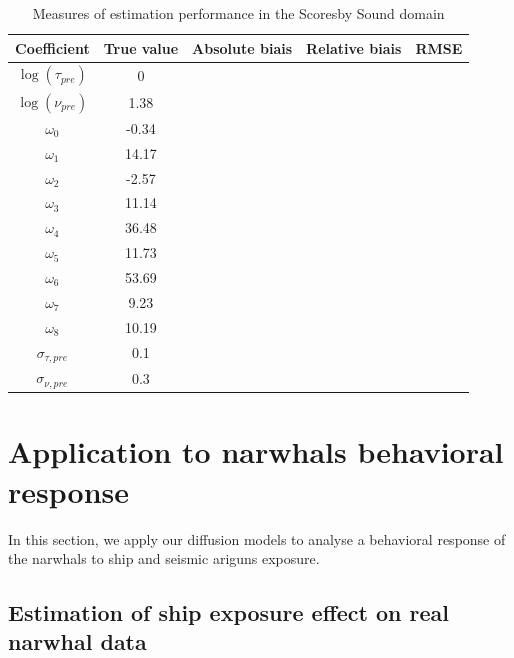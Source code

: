 \documentclass[11pt]{article}
\newcommand {\1}{\mathbb{1}}
\begin{document}
\begin{table}[H]
	\centering
	\begin{tabular}{|c|c|c|c|c|}
		\hline
		Coefficient  & True value & Absolute biais & Relative biais & RMSE  \\
		\hline
		$\log(\tau_{pre})$  &  0 &  & & \\
	
		$\log(\nu_{pre})$  &  1.38 &  & & \\
	
		$\omega_0$  & -0.34 &  & & \\
	
		$\omega_1$  & 14.17  &  & &  \\
		
		$\omega_2$  & -2.57 &  & & \\
		
		$\omega_3$  & 11.14 &  &  &\\
	
		$\omega_4$  & 36.48  &  & & \\
		
		$\omega_5$  & 11.73 &  & & \\
		
		$\omega_6$  & 53.69 &  & & \\
	
		$\omega_7$  & 9.23 &  & & \\
	
		$\omega_8$  & 10.19 &  &  &\\
		
		$\sigma_{\tau,pre}$ & 0.1 & & &\\
	
		$\sigma_{\nu,pre}$ & 0.3 & & &\\
		\hline
	\end{tabular}
	\caption{Measures of estimation performance in the Scoresby Sound domain}
	\label{table: estimation performance fjords}
\end{table}





\section{Application to narwhals behavioral response}


In this section, we apply our diffusion models to analyse a behavioral response of the narwhals to ship and seismic ariguns exposure.


\subsection{Estimation of ship exposure effect on real narwhal data}
\end{document}
